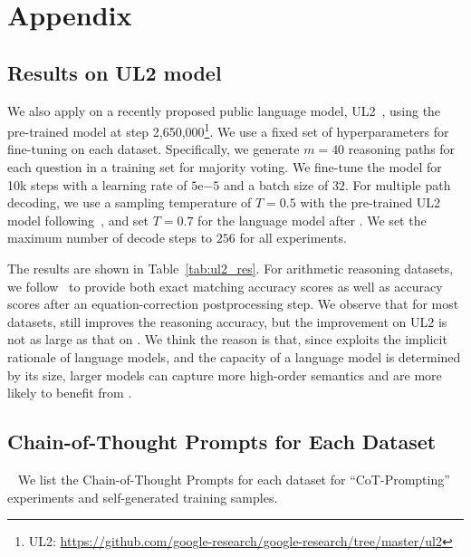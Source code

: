 
\clearpage
\appendix
\section{Appendix}
\label{app:appendix}

\subsection{Results on UL2 model}
We also apply \method on a recently proposed public language model, UL2~\citep{Tay2022UL2UL}, using the pre-trained model at step 2,650,000\footnote{UL2: \url{https://github.com/google-research/google-research/tree/master/ul2}}. We use a fixed set of hyperparameters for fine-tuning on each dataset. Specifically, we generate $m=40$ reasoning paths for each question in a training set for majority voting. We fine-tune the model for 10k steps with a learning rate of $5$e$-5$ and a batch size of $32$. For multiple path decoding, we use a sampling temperature of $T=0.5$ with the pre-trained UL2 model following~\citet{Tay2022UL2UL}, and set $T=0.7$ for the language model after \method. We set the maximum number of decode steps to $256$ for all experiments.

The results are shown in Table~\ref{tab:ul2_res}. For arithmetic reasoning datasets, we follow~\citep{Tay2022UL2UL} to provide both exact matching accuracy scores as well as accuracy scores after an equation-correction postprocessing step. We observe that for most datasets, \method still improves the reasoning accuracy, but the improvement on UL2 is not as large as that on \bigmodel. We think the reason is that, since \method exploits the implicit rationale of language models, and the capacity of a language model is determined by its size, larger models can capture more high-order semantics and are more likely to benefit from \method. 



\subsection{Chain-of-Thought Prompts for Each Dataset}~\label{sec:app_prompt}
We list the Chain-of-Thought Prompts for each dataset for ``CoT-Prompting'' experiments and self-generated training samples.

